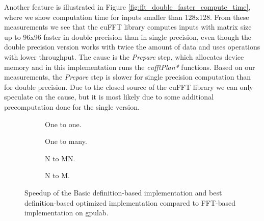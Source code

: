 Another feature is illustrated in Figure \ref{fig:fft_double_faster_compute_time}, where we show computation time for inputs smaller than 128x128. From these measurements we see that the cuFFT library computes inputs with matrix size up to 96x96 faster in double precision than in single precision, even though the  double precision version works with twice the amount of data and uses operations with lower throughput. The cause is the \textit{Prepare} step, which allocates device memory and in this implementation runs the \textit{cufftPlan*} functions. Based on our measurements, the \textit{Prepare} step is slower for single precision computation than for double precision. Due to the closed source of the cuFFT library we can only speculate on the cause, but it is most likely due to some additional precomputation done for the single version. 


\begin{figure}[ht]
	\centering	
	\begin{subfigure}{0.4\textwidth}
		\centering
		\def\svgwidth{\textwidth}
		
		\caption{One to one.}
		\label{fig:fft_speedup_one_to_one}
	\end{subfigure}
	\begin{subfigure}{0.4\textwidth}
		\centering
		\def\svgwidth{\textwidth}
		
		\caption{One to many.}
		\label{fig:fft_speedup_one_to_many}
	\end{subfigure}
	\begin{subfigure}{0.4\textwidth}
		\centering
		\def\svgwidth{\textwidth}
		
		\caption{N to MN.}
		\label{fig:fft_speedup_n_to_mn}
	\end{subfigure}
	\begin{subfigure}{0.4\textwidth}
		\centering
		\def\svgwidth{\textwidth}
		
		\caption{N to M.}
		\label{fig:fft_speedup_n_to_m}
	\end{subfigure}
	\caption{Speedup of the Basic definition-based implementation and best definition-based optimized implementation compared to FFT-based implementation on gpulab.}
	\label{fig:fft_speedup}
\end{figure}

